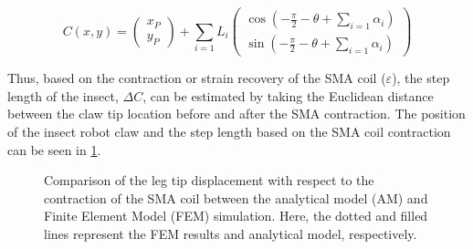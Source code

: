 \begin{equation}\label{eq:C}
  C(x,y) = \begin{pmatrix} x_P \\ y_P \end{pmatrix} + \sum_{i=1}L_i\begin{pmatrix} \cos(-\frac{\pi}{2}-\theta+\sum_{i=1}\alpha_i) \\ \sin(-\frac{\pi}{2}-\theta+\sum_{i=1}\alpha_i) \end{pmatrix}
\end{equation}

Thus, based on the contraction or strain recovery of the SMA coil ($\varepsilon$), the step length of the insect, $\Delta C$, can be estimated by taking the Euclidean distance between the claw tip location before and after the SMA contraction. The position of the insect robot claw and the step length based on the SMA coil contraction can be seen in \cref{fig:insect-am-fem-compare}.

\begin{figure}[hb!] %
  \centering
  \resizebox{0.75\columnwidth}{!}{}
  \caption[Comparison of the leg tip displacement with respect to the contraction of the SMA coil between the analytical model (AM) and Finite Element Model (FEM) simulation]{Comparison of the leg tip displacement with respect to the contraction of the SMA coil between the analytical model (AM) and Finite Element Model (FEM) simulation. Here, the dotted and filled lines represent the FEM results and analytical model, respectively.}
  \label{fig:insect-am-fem-compare}
\end{figure}

